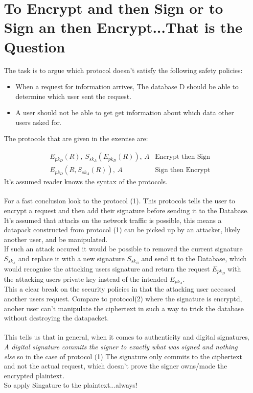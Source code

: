 \documentclass[12pt]{article}
\begin{document}
\section*{To Encrypt and then Sign  or to Sign an then Encrypt...That is the Question}
The task is to argue which protocol doesn't satisfy the following safety policies:
\begin{itemize}
    \item When a request for information arrives, The database D should be able to determine which user sent
the request.
    \item A user should not be able to get get information about which data other users asked for.
\end{itemize}
The protocols that are given in the exercise are:

\begin{align}
&E_{pk_D}(R),\: S_{sk_A}(E_{pk_D}(R)), \: A   &\text{Encrypt then Sign}\\
&E_{pk_D}(R, S_{sk_A}(R)), \: A                &\text{Sign then Encrypt}
\end{align}
It's assumed reader knows the syntax of the protocols.\\\\
\noindent For a fast conclusion look to the protocol (1). This protocols tells the user to encrypt a request and then add their signature before sending it to the Database. It's assumed that attacks on the network traffic is possible, this means a datapack constructed from protocol (1) can be picked up by an attacker, likely another user, and be manipulated.\\
If such an attack occured it would be possible to removed the current signature $S_{sk_A}$ and replace it with a new signature $S_{sk_B}$ and send it to the Database, which would recognise the attacking users signature and return the request $E_{pk_B}$ with the attacking users private key instead of the intended $E_{pk_A}$.\\
This a clear break on the security policies in that the attacking user accessed another users request. Compare to protocol(2) where the signature is encryptd, anoher user can't manipulate the ciphertext in such a way to trick the database without destroying the datapacket.\\\\
\noindent This tells us that in general, when it comes to authenticity and digital signatures, \textit{A digital signature commits the signer to exactly what was signed and nothing else} so in the case of protocol (1) The signature only commits to the ciphertext and not the actual request, which doesn't prove the signer owns/made the encrypted plaintext.\\
So apply Singature to the plaintext...always!


\printbibliography
\end{document}
